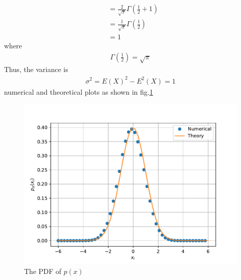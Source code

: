\documentclass[12pt]{book}
\providecommand{\brak}[1]{\ensuremath{\left(#1\right)}}
\begin{document}
\begin{enumerate}
\begin{align}
    &= \frac{2}{\sqrt{\pi}} \Gamma\brak{{\frac{1}{2}+1}}\\
    &= \frac{1}{\sqrt{\pi}}\Gamma\brak{\frac{1}{2}} \\
    &= 1
\end{align}
where 
\begin{align}
\Gamma\brak{\frac{1}{2}}=\sqrt{\pi}
\end{align}
%
Thus, the  variance is
\begin{align}
    \sigma^2 =  E\brak X^2 - E^2\brak X = 1
\end{align}
numerical and theoretical  plots as shown in fig.\ref{fig:gauss_pdf}
\begin{center}
\end{center}
\begin{figure}
\centering
\includegraphics[scale=0.5]{./figs/2/2.2.4.pdf}  
\caption{The PDF of $p\brak{x}$}
\label{fig:gauss_pdf}
\end{figure}
\end{enumerate}
\end{document}

